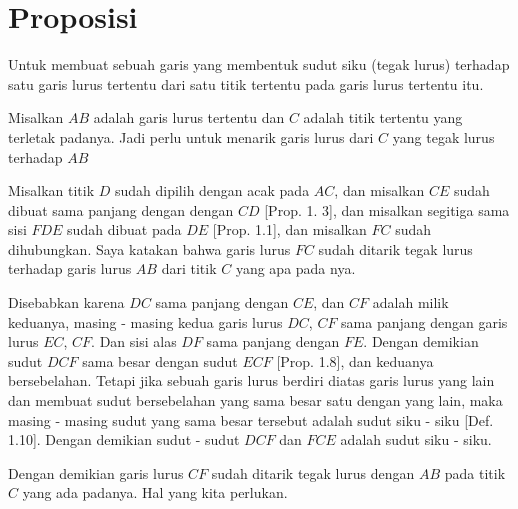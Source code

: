 \documentclass[a4paper]{book}
\begin{document}
\section*{\centering Proposisi \thesection} 
Untuk membuat sebuah garis yang membentuk sudut siku (tegak lurus) terhadap satu
garis lurus tertentu dari satu titik tertentu pada garis lurus tertentu itu.
\begin{center}
\end{center}

Misalkan $AB$ adalah garis lurus tertentu dan $C$ adalah titik tertentu yang
terletak padanya. Jadi perlu untuk menarik garis lurus dari $C$ yang tegak
lurus terhadap $AB$

Misalkan titik $D$ sudah dipilih dengan acak pada $AC$, dan misalkan $CE$ 
sudah dibuat sama panjang dengan dengan $CD$ [Prop. 1. 3], dan misalkan
segitiga sama sisi $FDE$ sudah dibuat pada $DE$ [Prop. 1.1], dan misalkan
$FC$ sudah dihubungkan. Saya katakan bahwa garis lurus $FC$ sudah ditarik
tegak lurus terhadap garis lurus $AB$ dari titik $C$ yang apa pada nya.

Disebabkan karena $DC$ sama panjang dengan $CE$, dan $CF$ adalah milik keduanya, 
masing - masing kedua garis lurus $DC$, $CF$ sama panjang dengan garis lurus
$EC$, $CF$. Dan sisi alas $DF$ sama panjang dengan $FE$. Dengan demikian
sudut $DCF$ sama besar dengan sudut $ECF$ [Prop. 1.8], dan keduanya 
bersebelahan. Tetapi jika sebuah garis lurus berdiri diatas garis lurus
yang lain dan membuat sudut bersebelahan yang sama besar satu dengan yang
lain, maka masing - masing sudut yang sama besar tersebut adalah sudut
siku - siku [Def. 1.10]. Dengan demikian sudut - sudut
$DCF$ dan $FCE$ adalah sudut siku - siku.

Dengan demikian garis lurus $CF$ sudah ditarik tegak lurus dengan
$AB$ pada titik $C$ yang ada padanya. Hal yang kita perlukan.


\end{document}
